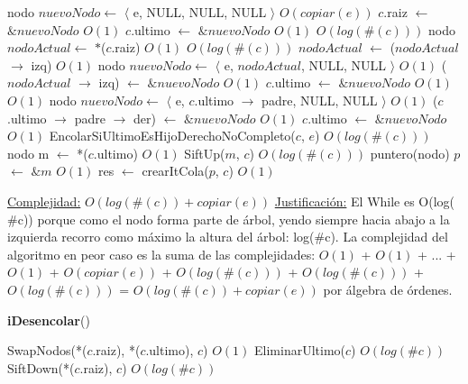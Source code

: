 \begin{Algoritmos}
\begin{algorithmic}[1]
        \State nodo $nuevoNodo \gets$ $\langle$ e, NULL, NULL, NULL $\rangle$   \Comment $O(copiar(e))$
        \State $c$.raiz $\gets$ $\& nuevoNodo$ \Comment $O(1)$
        \State $c$.ultimo $\gets$ $\& nuevoNodo$ \Comment $O(1)$
    \Else
          \Comment $O(log(\#(c)))$
            \State nodo $nodoActual \gets$ $*$($c$.raiz) \Comment $O(1)$
              \Comment $O(log(\#(c)))$
                \State $nodoActual$ $\gets$ ($nodoActual$ $\to$ izq)  \Comment $O(1)$
            \EndWhile
            \State nodo $nuevoNodo \gets$ $\langle$ e, $nodoActual$, NULL, NULL $\rangle$   \Comment $O(1)$
            \State ($nodoActual$ $\to$ izq) $\gets$ $\& nuevoNodo$ \Comment $O(1)$
            \State $c$.ultimo $\gets$ $\& nuevoNodo$ \Comment $O(1)$
        \Else
              \Comment $O(1)$
                \State nodo $nuevoNodo \gets$ $\langle$ e, $c$.ultimo $\to$ padre, NULL, NULL $\rangle$   \Comment $O(1)$
                \State ($c$.ultimo $\to$ padre $\to$ der) $\gets$ $\& nuevoNodo$ \Comment $O(1)$
                \State $c$.ultimo $\gets$ $\& nuevoNodo$ \Comment $O(1)$
            \Else %
                \State EncolarSiUltimoEsHijoDerechoNoCompleto($c$, $e$) \Comment $O(log(\#(c)))$
            \EndIf
        \EndIf
    \EndIf
    \State nodo m $\gets$ *($c$.ultimo) \Comment $O(1)$
    \State SiftUp($m$, $c$) \Comment $O(log(\#(c)))$
    \State puntero(nodo) $p$ $\gets$ $\&m$ \Comment $O(1)$
    \State res $\gets$ crearItCola($p$, $c$) \Comment $O(1)$

    \medskip
    \Statex \underline{Complejidad:} $O(log(\#(c)) + copiar(e))$
    \Statex \underline{Justificaci\'on:} El While es O(log($\#$c)) porque como el nodo forma parte de \'arbol, yendo siempre hacia abajo a la izquierda recorro como m\'aximo la altura del \'arbol: log($\#$c). La complejidad del algoritmo en peor caso es la suma de las complejidades: $O(1)$ + $O(1)$ + ... + $O(1)$ + $O(copiar(e))$ + $O(log(\#(c)))$ + $O(log(\#(c)))$ + $O(log(\#(c)))$ = $O(log(\#(c)) + copiar(e))$ por \'algebra de \'ordenes.
\end{algorithmic}


\begin{algorithm}[H]
{\textbf{iDesencolar}()}
\begin{algorithmic}[1]
    
    \State SwapNodos(*($c$.raiz), *($c$.ultimo), $c$) \Comment $O(1)$
    \State EliminarUltimo($c$) \Comment $O(log(\#c))$
    \State SiftDown(*($c$.raiz), $c$) \Comment $O(log(\#c))$
    

\end{algorithmic}
\end{algorithm}
\end{Algoritmos}
